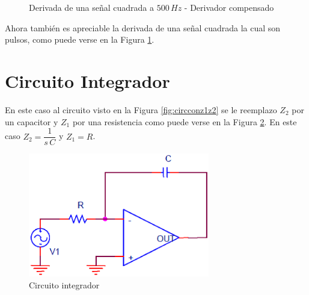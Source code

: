 \documentclass[11pt, a4paper]{article}
\begin{document}
\begin{figure}[H]
	\begin{center}
		\caption{Derivada de una señal cuadrada a $500 \,Hz$ - Derivador compensado}
		\label{fig:derivCUAdradaCOMP}
	\end{center}
\end{figure}

Ahora también es apreciable la derivada de una señal cuadrada la cual son pulsos, como puede verse en la Figura \ref{fig:derivCUAdradaCOMP}.











\section{Circuito Integrador}
En este caso al circuito visto en la Figura \ref{fig:circconz1z2} se le reemplazo $Z_2$ por un capacitor y $Z_1$ por una resistencia como puede verse en la Figura \ref{fig:circuitointegrador}. En este caso $Z_2=\dfrac{1}{s \, C}$ y $Z_1= R$.

\begin{figure}[H]
\centering
\includegraphics[scale=0.5]{circuitointegrador.png}
\caption{Circuito integrador}
\label{fig:circuitointegrador}
\end{figure}
\end{document}
